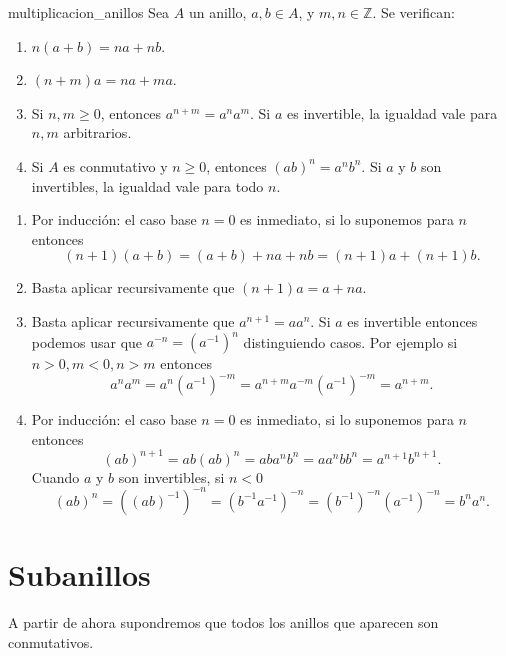 \begin{lemma}{}{multiplicacion_anillos}
    Sea \( A \) un anillo, \( a, b \in A \), y \( m, n \in \mathbb{Z} \). Se verifican:
    \begin{enumerate}
        \item \( n (a + b) = n a + n b \).
        \item \( (n + m) a = n a + m a \).
        \item Si \( n, m \geq 0 \), entonces \( a^{n + m} = a^n a^m \). Si \( a \) es invertible, la igualdad vale para \( n, m \) arbitrarios.
        \item Si \( A \) es conmutativo y \( n \geq 0 \), entonces \( (a b)^n = a^n b^n \). Si \( a \) y \( b \) son invertibles, la igualdad vale para todo \( n \).
    \end{enumerate}
\end{lemma}

\begin{proofbox}
    \begin{enumerate}
        \item Por inducción: el caso base $n=0$ es inmediato, si lo suponemos para $n$ entonces
        \[
        (n+1) (a + b) = (a+b)+ n a + n b = (n+1) a + (n+1) b.
        \]
        \item Basta aplicar recursivamente que $(n+1)a = a + na$.
        \item Basta aplicar recursivamente que $a^{n+1} = a a^n$. Si $a$ es invertible entonces podemos usar que $a^{-n}=(a^{-1})^n$ distinguiendo casos. Por ejemplo si $n>0,m<0, n>m$ entonces
        \[
        a^{n}a^{m}=a^n(a^{-1})^{-m}=a^{n+m}a^{-m}(a^{-1})^{-m}=a^{n+m}.
        \]
        \item Por inducción: el caso base $n=0$ es inmediato, si lo suponemos para $n$ entonces
        \[
        (ab)^{n+1}=ab(ab)^n=aba^nb^n=aa^nbb^n=a^{n+1}b^{n+1}.
        \]
        Cuando \( a \) y \( b \) son invertibles, si $n<0$
        \[
        (ab)^n=((ab)^{-1})^{-n}=(b^{-1}a^{-1})^{-n}=(b^{-1})^{-n}(a^{-1})^{-n}=b^n a^n.
        \]
    \end{enumerate}
\end{proofbox}

\clearpage
\section{Subanillos}

\begin{remark}
    A partir de ahora supondremos que todos los anillos que aparecen son conmutativos.
\end{remark}

